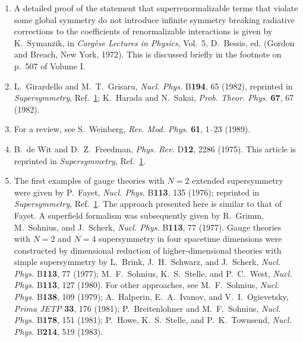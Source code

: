 \begin{enumerate}
  \item {}\label{ch27-ref-8}
  A detailed proof of the statement that superrenormalizable terms that
  violate some global symmetry do not introduce infinite symmetry
  breaking radiative corrections to the coefficients of renormalizable
  interactions is given by K.~Symanzik, in \textit{Carg\`ese Lectures
  in Physics}, Vol.~5, D.~Bessis, ed. (Gordon and Breach, New York,
  1972). This is discussed briefly in the footnote on p.~507 of Volume
  I.

  \item {}\label{ch27-ref-9}
  L.~Girardello and M.~T.~Grisaru, \textit{Nucl. Phys.} B\textbf{194},
  65 (1982), reprinted in \textit{Supersymmetry},
  Ref.~\hyperref[ch27-ref-1]{1}; K.~Harada and N.~Sakai,
  \textit{Prob. Theor. Phys.} \textbf{67}, 67 (1982).

  \item {}\label{ch27-ref-10}
  For a review, see S.~Weinberg, \textit{Rev. Mod. Phys.} \textbf{61},
  1--23 (1989).

  \item {}\label{ch27-ref-11}
  B.~de Wit and D.~Z.~Freedman, \textit{Phys. Rev.} D\textbf{12}, 2286
  (1975). This article is reprinted in \textit{Supersymmetry},
  Ref.~\hyperref[ch27-ref-1]{1}.

  \item {}\label{ch27-ref-12}
  The first examples of gauge theories with $N=2$ extended
  supersymmetry were given by P.~Fayet, \textit{Nucl. Phys.}
  B\textbf{113}, 135 (1976); reprinted in \textit{Supersymmetry},
  Ref.~\hyperref[ch27-ref-1]{1}. The approach presented here is similar
  to that of Fayet. A superfield formalism was subsequently given by
  R.~Grimm, M.~Sohnius, and J.~Scherk, \textit{Nucl. Phys.}
  B\textbf{113}, 77 (1977). Gauge theories with $N=2$ and $N=4$
  supersymmetry in four spacetime dimensions were constructed by
  dimensional reduction of higher-dimensional theories with simple
  supersymmetry by L.~Brink, J.~H.~Schwarz, and J.~Scherk,
  \textit{Nucl. Phys.} B\textbf{113}, 77 (1977); M.~F.~Sohnius,
  K.~S.~Stelle, and P.~C.~West, \textit{Nucl. Phys.} B\textbf{113}, 127
  (1980). For other approaches, see M.~F.~Sohnius, \textit{Nucl. Phys.}
  B\textbf{138}, 109 (1979); A.~Halperin, E.~A.~Ivanov, and
  V.~I.~Ogievetsky, \textit{Prima JETP} \textbf{33}, 176 (1981);
  P.~Breitenlohner and M.~F.~Sohnius, \textit{Nucl. Phys.}
  B\textbf{178}, 151 (1981); P.~Howe, K.~S.~Stelle, and
  P.~K.~Townsend, \textit{Nucl. Phys.} B\textbf{214}, 519 (1983).


\end{enumerate}
